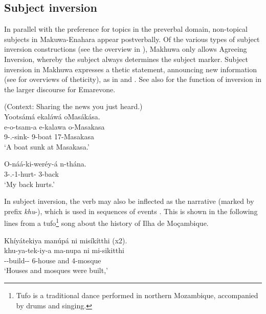 \documentclass[output=paper]{langscibook}
\begin{document}
\subsection{Subject inversion}
\label{bkm:Ref95915158}
In parallel with the preference for topics in the preverbal domain, non-topical subjects in Makuwa-Enahara appear postverbally. Of the various types of subject inversion constructions (see the overview in \citealt{MartenvanderWal2014}), Makhuwa only allows Agreeing Inversion, whereby the subject always determines the subject marker. Subject inversion in Makhuwa expresses a thetic statement, announcing new information (see \citealt{Sasse1996,Sasse2006} for overviews of theticity), as in  and . See also \citet{Kröger2010} for the function of inversion in the larger discourse for Emarevone.

\ea
\label{bkm:Ref95377065}
(Context: Sharing the news you just heard.)\\
Yootsámá ekaláwá oMasákása.\\
\gll
e-o-tsam-a  e-kalawa  o-Masakasa\\
9\SM{}-\PFV{}.\DJ{}-sink-\FV{}  9-boat  17-Masakasa\\
\glt
‘A boat sunk at Masakasa.’\\


\z

\ea
\label{bkm:Ref95379220}
\gll
O-náá-ki-weréy-á  n-thána.\\
3\SM{}-\PRS{}.\DJ{}-1\SG{}-hurt-\FV{}  3-back\\
\glt
‘My back hurts.’ \citep[198]{vanderWal2009a}\\

\z


In subject inversion, the verb may also be inflected as the narrative (marked by prefix \textit{khu}{}-), which is used in sequences of events \citep{vanderWal2009a}. This is shown in the following lines from a tufo\footnote{Tufo is a traditional dance performed in northern Mozambique, accompanied by drums and singing.} song about the history of Ilha de Moçambique.

\ea
\ea
Khíyátekiya manúpá ni misíkítthi (x2).\\
\gll
khu-ya-tek-iy-a  ma-nupa  ni  mi-sikitthi\\
\NARR{}-\IPFV{}-build-\PASS{}-\FV{}  6-house  and  4-mosque\\
\glt
‘Houses and mosques were built,’\\
\end{document}
